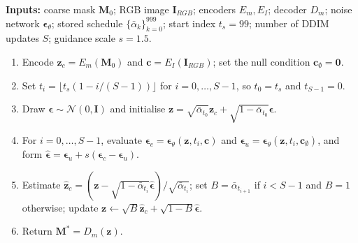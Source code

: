 \documentclass[jimaging,article,submit,pdftex,moreauthors]
  {Definitions/mdpi}
\DeclareRobustCommand{\rev}[1]{\textcolor{blue}{#1}}
\newcommand{\revbegin}{\begingroup\color{blue}}
\DeclareRobustCommand{\rev}[1]{#1}
\newcommand{\revbegin}{\begingroup}
\newcommand{\revend}{\ifhmode\par\fi\endgroup}
\begin{document}
\begin{table}[htbp]
\caption{\rev{Refinement} sampling procedure \rev{of the executable configuration}.}
\label{alg:latent_refinement}
\centering
\begin{minipage}{0.96\textwidth}
\small
\revbegin{}\textbf{Inputs:} coarse mask $\mathbf{M}_0$; RGB image $\mathbf{I}_{RGB}$; encoders $E_m,E_I$; decoder $D_m$; noise network $\boldsymbol{\epsilon}_\theta$; stored schedule $\{\bar{\alpha}_k\}_{k=0}^{999}$; start index $t_s=99$; number of DDIM updates $S$; guidance scale $s=1.5$.\par
\begin{enumerate}[leftmargin=2em,itemsep=2pt,topsep=4pt]
  \item Encode $\mathbf{z}_c=E_m(\mathbf{M}_0)$ and $\mathbf{c}=E_I(\mathbf{I}_{RGB})$; set the null condition $\mathbf{c}_{\emptyset}=\mathbf{0}$.
  \item Set $t_i=\lfloor t_s(1-i/(S-1))\rfloor$ for $i=0,\ldots,S-1$, so $t_0=t_s$ and $t_{S-1}=0$.
  \item Draw $\boldsymbol{\epsilon}\sim\mathcal{N}(0,\mathbf{I})$ and initialise $\mathbf{z}=\sqrt{\bar{\alpha}_{t_0}}\mathbf{z}_c+\sqrt{1-\bar{\alpha}_{t_0}}\boldsymbol{\epsilon}$.
  \item For $i=0,\ldots,S-1$, evaluate $\boldsymbol{\epsilon}_{c}=\boldsymbol{\epsilon}_\theta(\mathbf{z},t_i,\mathbf{c})$ and $\boldsymbol{\epsilon}_{u}=\boldsymbol{\epsilon}_\theta(\mathbf{z},t_i,\mathbf{c}_{\emptyset})$, and form $\hat{\boldsymbol{\epsilon}}=\boldsymbol{\epsilon}_{u}+s(\boldsymbol{\epsilon}_{c}-\boldsymbol{\epsilon}_{u})$.
  \item Estimate $\hat{\mathbf{z}}_c=(\mathbf{z}-\sqrt{1-\bar{\alpha}_{t_i}}\hat{\boldsymbol{\epsilon}})/\sqrt{\bar{\alpha}_{t_i}}$; set $B=\bar{\alpha}_{t_{i+1}}$ if $i<S-1$ and $B=1$ otherwise; update $\mathbf{z}\leftarrow\sqrt{B}\hat{\mathbf{z}}_c+\sqrt{1-B}\hat{\boldsymbol{\epsilon}}$.
  \item Return $\mathbf{M}^*=D_m(\mathbf{z})$.
\end{enumerate}\revend{}
\end{minipage}
\end{table}
\end{document}
